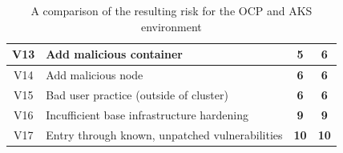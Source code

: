 \begin{table}[H]
{\begin{tabular}{|c|l|c|c|}
V13             & Add malicious container                                                                & \textbf{5}     & \textbf{6}     \\ \hline
V14             & Add malicious node                                                                     & \textbf{6}     & \textbf{6}     \\ \hline
V15             & Bad user practice (outside of cluster)                                                 & \textbf{6}     & \textbf{6}     \\ \hline
V16             & Incufficient base infrastructure hardening                                             & \textbf{9}     & \textbf{9}     \\ \hline
V17             & Entry through known, unpatched vulnerabilities                                         & \textbf{10}    & \textbf{10}    \\ \hline
\end{tabular}%
}
\caption{A comparison of the resulting risk for the OCP and AKS environment}
\label{tab:estimateComparison}
\end{table}


